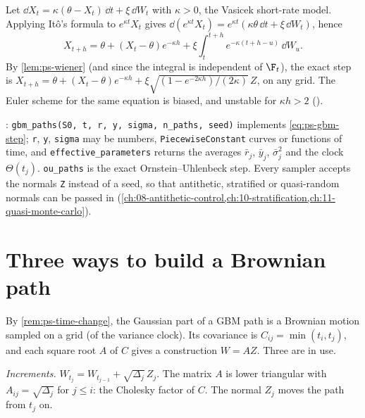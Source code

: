 \begin{example}\label{exa:ps-ou}
Let $\dd X_t=\kappa(\theta-X_t)\,\dd t+\xi\,\dd W_t$ with $\kappa>0$, the Vasicek short-rate
model. Applying It\^o's formula to $e^{\kappa t}X_t$ gives
$\dd(e^{\kappa t}X_t)=e^{\kappa t}(\kappa\theta\,\dd t+\xi\,\dd W_t)$, hence
\[
  X_{t+h}=\theta+(X_t-\theta)e^{-\kappa h}+\xi\int_t^{t+h}e^{-\kappa(t+h-u)}\,\dd W_u .
\]
By \cref{lem:ps-wiener} (and since the integral is independent of $\F_t$), the exact step is
$X_{t+h}=\theta+(X_t-\theta)e^{-\kappa h}+\xi\sqrt{(1-e^{-2\kappa h})/(2\kappa)}\,Z$, on
any grid. The Euler scheme for the same equation is biased, and unstable for $\kappa h>2$
().
\end{example}


\begin{incode}
: \texttt{gbm\_paths(S0, t, r, y, sigma, n\_paths, seed)}
implements \eqref{eq:ps-gbm-step}; \texttt{r}, \texttt{y}, \texttt{sigma} may be numbers,
\texttt{PiecewiseConstant} curves or functions of time, and \texttt{effective\_parameters}
returns the averages $\bar r_j$, $\bar y_j$, $\bar\sigma^2_j$ and the clock $\Theta(t_j)$.
\texttt{ou\_paths} is the exact Ornstein--Uhlenbeck step. Every sampler accepts the normals
\texttt{Z} instead of a seed, so that antithetic, stratified or quasi-random normals can be
passed in (\cref{ch:08-antithetic-control,ch:10-stratification,ch:11-quasi-monte-carlo}).
\end{incode}

\section{Three ways to build a Brownian path}\label{sec:ps-brownian}

By \cref{rem:ps-time-change}, the Gaussian part of a GBM path is a Brownian motion sampled
on a grid (of the variance clock). Its covariance is $C_{ij}=\min(t_i,t_j)$, and each square root
$A$ of $C$ gives a construction $W=AZ$. Three are in use.

\emph{Increments.} $W_{t_j}=W_{t_{j-1}}+\sqrt{\Delta_j}\,Z_j$. The matrix $A$ is lower
triangular with $A_{ij}=\sqrt{\Delta_j}$ for $j\le i$: the Cholesky factor of $C$. The
normal $Z_j$ moves the path from $t_j$ on.

